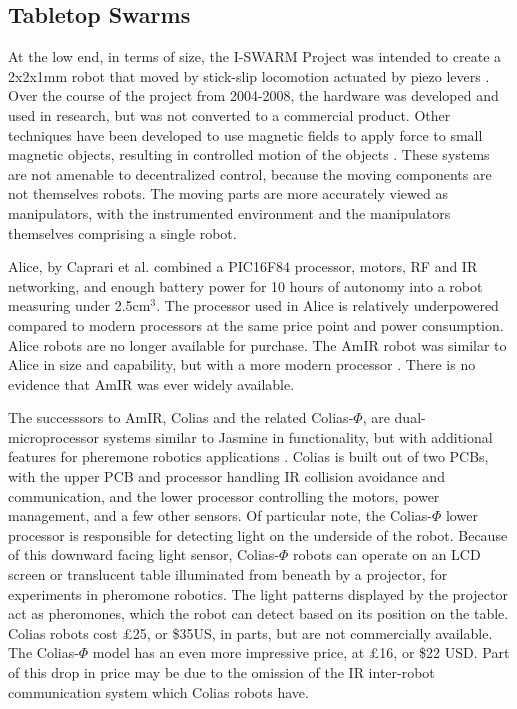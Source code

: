 \documentclass[]{article}
\begin{document}
\subsection{Tabletop Swarms}

At the low end, in terms of size, the I-SWARM Project was intended to create a 2x2x1mm robot that moved by stick-slip locomotion actuated by piezo levers \cite{seyfried2005swarm}. 
Over the course of the project from 2004-2008, the hardware was developed and used in research, but was not converted to a commercial product.
Other techniques have been developed to use magnetic fields to apply force to small magnetic objects, resulting in controlled motion of the objects \cite{floyd2008untethered, pelrine2012diamagnetically}.
These systems are not amenable to decentralized control, because the moving components are not themselves robots. 
The moving parts are more accurately viewed as manipulators, with the instrumented environment and the manipulators themselves comprising a single robot. 

Alice, by Caprari et al. \cite{caprari1998autonomous} combined a PIC16F84 processor, motors, RF and IR networking, and enough battery power for 10 hours of autonomy into a robot measuring under 2.5cm$^3$. 
The processor used in Alice is relatively underpowered compared to modern processors at the same price point and power consumption. 
Alice robots are no longer available for purchase. 
The AmIR robot was similar to Alice in size and capability, but with a more modern processor \cite{arvin2009development}.
There is no evidence that AmIR was ever widely available.

The successsors to AmIR, Colias and the related Colias-$\Phi$, are dual-microprocessor systems similar to Jasmine in functionality, but with additional features for pheremone robotics applications \cite{arvin2014colias, arvin2015colias}. 
Colias is built out of two PCBs, with the upper PCB and processor handling IR collision avoidance and communication, and the lower processor controlling the motors, power management, and a few other sensors.
Of particular note, the Colias-$\Phi$ lower processor is responsible for detecting light on the underside of the robot. 
Because of this downward facing light sensor, Colias-$\Phi$ robots can operate on an LCD screen or translucent table illuminated from beneath by a projector, for experiments in pheromone robotics. 
The light patterns displayed by the projector act as pheromones, which the robot can detect based on its position on the table. 
Colias robots cost \pounds25, or \$35US, in parts, but are not commercially available. 
The Colias-$\Phi$ model has an even more impressive price, at \pounds16, or \$22 USD.
Part of this drop in price may be due to the omission of the IR inter-robot communication system which Colias robots have. 
\end{document}
